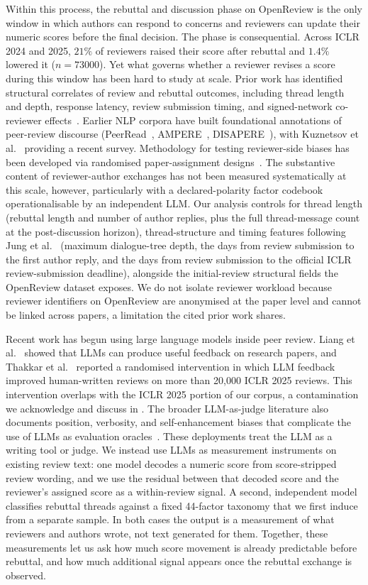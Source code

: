 \documentclass{article}
\begin{document}
Within this process, the rebuttal and discussion phase on OpenReview is the only window in which authors can respond to concerns and reviewers can update their numeric scores before the final decision. The phase is consequential. Across ICLR 2024 and 2025, $21\%$ of reviewers raised their score after rebuttal and $1.4\%$ lowered it ($n = \num{73000}$). Yet what governs whether a reviewer revises a score during this window has been hard to study at scale. Prior work has identified structural correlates of review and rebuttal outcomes, including thread length and depth, response latency, review submission timing, and signed-network co-reviewer effects~\cite{huang,jung,kargaran}. Earlier NLP corpora have built foundational annotations of peer-review discourse (PeerRead~\cite{kang}, AMPERE~\cite{hua}, DISAPERE~\cite{kennard}), with Kuznetsov et al.~\cite{kuznetsov} providing a recent survey. Methodology for testing reviewer-side biases has been developed via randomised paper-assignment designs~\cite{stelmakh}. The substantive content of reviewer-author exchanges has not been measured systematically at this scale, however, particularly with a declared-polarity factor codebook operationalisable by an independent LLM. Our analysis controls for thread length (rebuttal length and number of author replies, plus the full thread-message count at the post-discussion horizon), thread-structure and timing features following Jung et al.~\cite{jung} (maximum dialogue-tree depth, the days from review submission to the first author reply, and the days from review submission to the official ICLR review-submission deadline), alongside the initial-review structural fields the OpenReview dataset exposes. We do not isolate reviewer workload because reviewer identifiers on OpenReview are anonymised at the paper level and cannot be linked across papers, a limitation the cited prior work shares.

Recent work has begun using large language models inside peer review. Liang et al.~\cite{liang} showed that LLMs can produce useful feedback on research papers, and Thakkar et al.~\cite{thakkar} reported a randomised intervention in which LLM feedback improved human-written reviews on more than 20{,}000 ICLR 2025 reviews. This intervention overlaps with the ICLR 2025 portion of our corpus, a contamination we acknowledge and discuss in . The broader LLM-as-judge literature also documents position, verbosity, and self-enhancement biases that complicate the use of LLMs as evaluation oracles~\cite{zheng}. These deployments treat the LLM as a writing tool or judge. We instead use LLMs as measurement instruments on existing review text: one model decodes a numeric score from score-stripped review wording, and we use the residual between that decoded score and the reviewer's assigned score as a within-review signal. A second, independent model classifies rebuttal threads against a fixed 44-factor taxonomy that we first induce from a separate sample. In both cases the output is a measurement of what reviewers and authors wrote, not text generated for them. Together, these measurements let us ask how much score movement is already predictable before rebuttal, and how much additional signal appears once the rebuttal exchange is observed.
\end{document}
